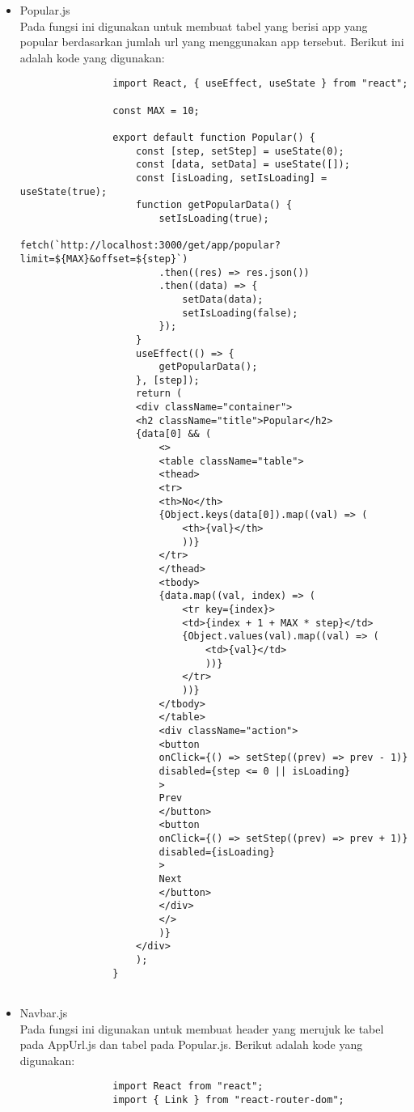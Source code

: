 \begin{itemize}
\begin{itemize}
\begin{lstlisting}
					{selectedData && (
						<div className="selected">
						<h3 className="title">{selectedData.name}</h3>
						<Bar data={selectedData.data} />
						</div>
						)}
					</div>
					);
				}
				
			\end{lstlisting}
		\item Popular.js\\
			Pada fungsi ini digunakan untuk membuat tabel yang berisi app yang popular berdasarkan jumlah url yang menggunakan app tersebut. Berikut ini adalah kode yang digunakan:
			\begin{lstlisting}
				import React, { useEffect, useState } from "react";
				
				const MAX = 10;
				
				export default function Popular() {
					const [step, setStep] = useState(0);
					const [data, setData] = useState([]);
					const [isLoading, setIsLoading] = useState(true);
					function getPopularData() {
						setIsLoading(true);
						fetch(`http://localhost:3000/get/app/popular?limit=${MAX}&offset=${step}`)
						.then((res) => res.json())
						.then((data) => {
							setData(data);
							setIsLoading(false);
						});
					}
					useEffect(() => {
						getPopularData();
					}, [step]);
					return (
					<div className="container">
					<h2 className="title">Popular</h2>
					{data[0] && (
						<>
						<table className="table">
						<thead>
						<tr>
						<th>No</th>
						{Object.keys(data[0]).map((val) => (
							<th>{val}</th>
							))}
						</tr>
						</thead>
						<tbody>
						{data.map((val, index) => (
							<tr key={index}>
							<td>{index + 1 + MAX * step}</td>
							{Object.values(val).map((val) => (
								<td>{val}</td>
								))}
							</tr>
							))}
						</tbody>
						</table>
						<div className="action">
						<button
						onClick={() => setStep((prev) => prev - 1)}
						disabled={step <= 0 || isLoading}
						>
						Prev
						</button>
						<button
						onClick={() => setStep((prev) => prev + 1)}
						disabled={isLoading}
						>
						Next
						</button>
						</div>
						</>
						)}
					</div>
					);
				}
				
			\end{lstlisting}
		\item Navbar.js\\
			Pada fungsi ini digunakan untuk membuat header yang merujuk ke tabel pada AppUrl.js dan tabel pada Popular.js. Berikut adalah kode yang digunakan:
			\begin{lstlisting}
				import React from "react";
				import { Link } from "react-router-dom";
				

\end{lstlisting}
\end{itemize}
\end{itemize}
